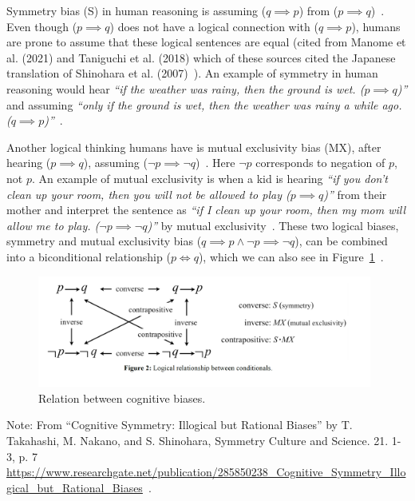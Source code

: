 Symmetry bias (S) in human reasoning is assuming ($q\implies p$) from ($p \implies q$)~\cite{lrimp}. Even though ($p \implies q$) does not have a logical connection with ($q \implies p$), humans are prone to assume that these logical sentences are equal (cited from Manome et al. (2021) and Taniguchi et al. (2018) which of these sources cited the Japanese translation of Shinohara et al. (2007)~\cite{cogn, els, shinohara}). An example of symmetry in human reasoning would hear \textit{“if the weather was rainy, then the ground is wet. ($p \implies q$)”} and assuming \textit{“only if the ground is wet, then the weather was rainy a while ago. ($q \implies p$)”}~\cite{hattori07}.

 Another logical thinking humans have is mutual exclusivity bias (MX), after hearing ($p \implies q$), assuming ($\neg p \implies \neg q$)~\cite{els,lrimp}. Here $\neg p$ corresponds to negation of $p$, not $p$. An example of mutual exclusivity is when a kid is hearing \textit{“if you don’t clean up your room, then you will not be allowed to play ($p \implies q$)”} from their mother and interpret the sentence as \textit{“if I clean up your room, then my mom will allow me to play. ($\neg p \implies \neg q$)”} by mutual exclusivity~\cite{hattori07}. These two logical biases, symmetry and mutual exclusivity bias ($q \implies p \land \neg p \implies \neg q$), can be combined into a biconditional relationship ($p \iff q$), which we can also see in Figure~\ref{cong23}~\cite{cogn}.

\begin{figure}[H]
    \centering
    \includegraphics[width=0.98\textwidth]{images/cong23.png}
    \caption{Relation between cognitive biases.}
    \label{cong23}
\end{figure}

\noindent Note: From “Cognitive Symmetry: Illogical but Rational Biases” by T. Takahashi, M. Nakano, and S. Shinohara, Symmetry Culture and Science. 21. 1-3, p. 7 \url{https://www.researchgate.net/publication/285850238_Cognitive_Symmetry_Illogical_but_Rational_Biases}~\cite{cogn}.
\vspace{10pt}

